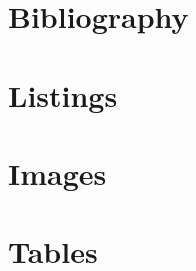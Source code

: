 \documentclass{article}
\begin{document}

\maketitle

\newpage
\tableofcontents

\newpage























\nocite{*}

\newpage
\section{Bibliography}
\printbibliography

\newpage
\section{Listings}
\renewcommand{\lstlistlistingname}{}
\lstlistoflistings

\newpage
\section{Images}
\renewcommand{\listfigurename}{}
\listoffigures

\newpage
\section{Tables}
\renewcommand{\listtablename}{}
\listoftables
\end{document}
